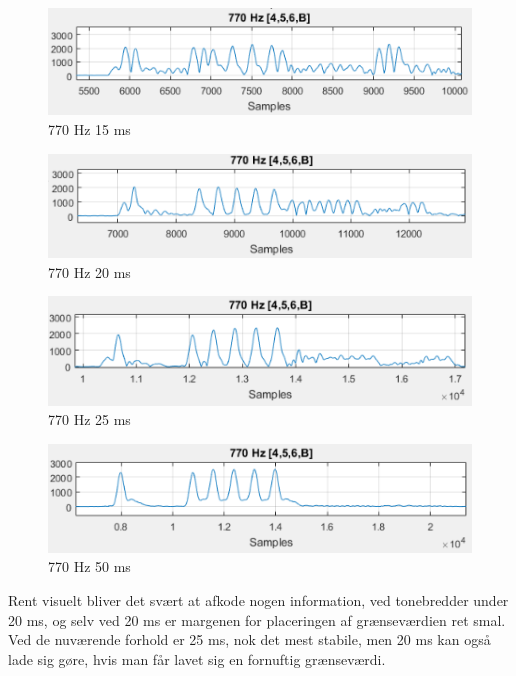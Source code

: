 \begin{figure}[h!]
\centering
\includegraphics[scale=0.8]{Billeder/Speed15ms.PNG}
\caption{770 Hz 15 ms}
\label{fig:15ms}
\end{figure} 

\begin{figure}[h!]
\centering
\includegraphics[scale=0.8]{Billeder/Speed20ms.PNG}
\caption{770 Hz 20 ms}
\label{fig:20ms}
\end{figure} 

\begin{figure}[h!]
\centering
\includegraphics[scale=0.8]{Billeder/Speed25ms.PNG}
\caption{770 Hz 25 ms}
\label{fig:25ms}
\end{figure} 

\begin{figure}[h!]
\centering
\includegraphics[scale=0.8]{Billeder/Speed50ms.PNG}
\caption{770 Hz 50 ms}
\label{fig:50ms}
\end{figure} 

Rent visuelt bliver det svært at afkode nogen information, ved tonebredder under 20 ms, og selv ved 20 ms er margenen for placeringen af grænseværdien ret smal. Ved de nuværende forhold er 25 ms, nok det mest stabile, men 20 ms kan også lade sig gøre, hvis man får lavet sig en fornuftig grænseværdi.

